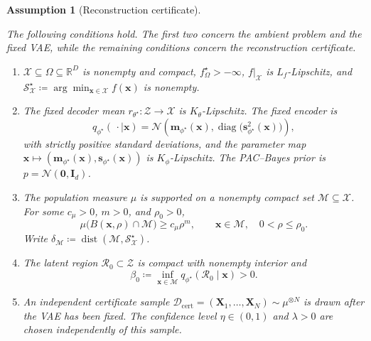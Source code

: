 \documentclass[10pt,a4paper]{amsart}
\newtheorem{assumption}{Assumption}
\begin{document}
\begin{assumption}[Reconstruction certificate]
\label{ass:fixed-representation-certificate}

The following conditions hold. The first two concern the ambient problem and the fixed VAE, while the remaining conditions concern the reconstruction certificate.

\begin{enumerate}
  \item $\mathcal{X}\subseteq\Omega\subseteq\mathbb{R}^D$ is nonempty and compact, $f_\Omega^\star> -\infty$,   $f|_{\mathcal{X}}$ is $L_f$-Lipschitz, and $\mathcal{S}_{\mathcal{X}}^\star  \coloneq \arg\min_{\mathbf{x}\in\mathcal{X}}f(\mathbf{x})$ is nonempty.
  
  \item The fixed decoder mean $r_{\theta^\star}:\mathcal{Z}\to\mathcal{X}$ is $K_\theta$-Lipschitz.  The fixed encoder is
  \[
    q_{\phi^\star}(\,\cdot\mid\mathbf{x})
    =\mathcal{N}\!\left(\mathbf{m}_{\phi^\star}(\mathbf{x}),
      \operatorname{diag}\bigl(\mathbf{s}_{\phi^\star}^2(\mathbf{x})\bigr)\right),
  \]
  with strictly positive standard deviations, and the parameter map
  $\mathbf{x}\mapsto
  (\mathbf{m}_{\phi^\star}(\mathbf{x}),
   \mathbf{s}_{\phi^\star}(\mathbf{x}))$ 
   is $K_\phi$-Lipschitz.  The PAC--Bayes prior is $p=\mathcal{N}(\mathbf{0},\mathbf{I}_d)$.

  \item The population measure $\mu$ is supported on a nonempty compact set $\mathcal{M}\subseteq\mathcal{X}$.  For some $c_\mu>0$, $m>0$, and
  $\rho_0>0$,
  \begin{equation}
    \mu\bigl(B(\mathbf{x},\rho)\cap\mathcal{M}\bigr)
    \geq c_\mu\rho^m,
    \qquad
    \mathbf{x}\in\mathcal{M},\quad 0<\rho\leq\rho_0.
    \label{eq:local-mass-condition}
  \end{equation}
  Write $\delta_{\mathcal{M}}  \coloneq \operatorname{dist}(\mathcal{M},\mathcal{S}_{\mathcal{X}}^\star)$.

  \item The latent region $\mathcal{R}_0\subset\mathcal{Z}$ is compact with nonempty interior and
  \begin{equation}
    \beta_0 \coloneq \inf_{\mathbf{x}\in\mathcal{M}}
      q_{\phi^\star}(\mathcal{R}_0\mid\mathbf{x})>0.
    \label{eq:latent-region-mass}
  \end{equation}

  \item An independent certificate sample
  $\mathcal{D}_{\mathrm{cert}}
  =(\mathbf{X}_1,\ldots,\mathbf{X}_N)\sim\mu^{\otimes N}$ 
  is drawn after the VAE has been fixed.  The confidence level $\eta\in(0,1)$ and $\lambda>0$ are chosen independently of this sample.
  
\end{enumerate}
\end{assumption}
\end{document}
